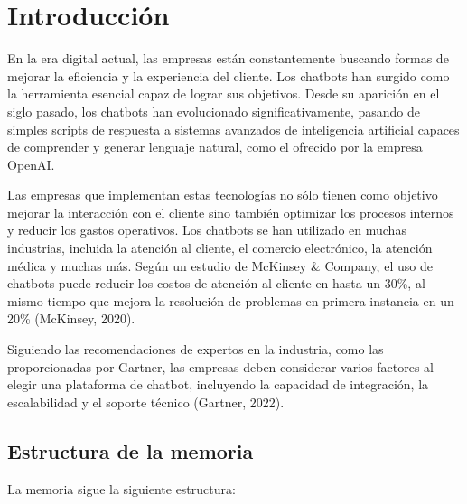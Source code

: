 \chapter{Introducción}

En la era digital actual, las empresas están constantemente buscando formas de mejorar la eficiencia y la experiencia del cliente. Los chatbots han surgido como la herramienta esencial capaz de lograr sus objetivos. Desde su aparición en el siglo pasado, los chatbots han evolucionado significativamente, pasando de simples scripts de respuesta a sistemas avanzados de inteligencia artificial capaces de comprender y generar lenguaje natural, como el ofrecido por la empresa OpenAI.

Las empresas que implementan estas tecnologías no sólo tienen como objetivo mejorar la interacción con el cliente sino también optimizar los procesos internos y reducir los gastos operativos. Los chatbots se han utilizado en muchas industrias, incluida la atención al cliente, el comercio electrónico, la atención médica y muchas más.
 Según un estudio de McKinsey & Company, el uso de chatbots puede reducir los costos de atención al cliente en hasta un 30\%, al mismo tiempo que mejora la resolución de problemas en primera instancia en un 20\% (McKinsey, 2020).

 Siguiendo las recomendaciones de expertos en la industria, como las proporcionadas por Gartner, las empresas deben considerar varios factores al elegir una plataforma de chatbot, incluyendo la capacidad de integración, la escalabilidad y el soporte técnico (Gartner, 2022). 
 

\section{Estructura de la memoria}\label{estructura-de-la-memoria}

La memoria sigue la siguiente estructura:

